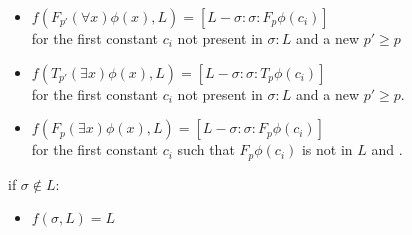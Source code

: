 {\begin{definition}
\begin{itemize}
            \item $f(F_{p'} (\forall x) \phi(x), L) = [L - \sigma: \sigma : F_{p} \phi(c_i) ]$\\ for the first constant $c_i$ not present in $\sigma:L$ and a new $p' \geq p$
            \item $f(T_{p'} (\exists x) \phi(x), L) = [L - \sigma: \sigma : T_{p} \phi(c_i) ]$ \\for the first constant $c_i$ not present in $\sigma:L$ and a new $p' \geq p$.
            \item $f(F_{p} (\exists x) \phi(x), L) = [L - \sigma: \sigma : F_{p} \phi(c_i) ]$\\ for the first constant $c_i$ such that $F_{p} \phi(c_i)$ is not in $L$ and .
        \end{itemize} 
    if $\sigma \notin L$:
    \begin{itemize}
         \item $f(\sigma,L) = L $
    \end{itemize}
\end{definition}
}


\def\wellBehavedTheorem{
    \begin{theorem}
        Given a signed sentence list L, if L is intuitionistically valid then f(L) is intuitionistically valid 
    \end{theorem}
    \begin{proof}
        \cite{book1} proves this by using the definition of forcing. We will do the most complex case, that has the most part of the ideas needed for the other ones:
        

        Case: if $L \ni F_{p} (\forall x) \phi(x) $ is intuitionistically valid, then there exists a frame $\mathcal{C}$ that respects it (in the sense of the Definition 6). 
        $\mathcal{C}$ contains q and a c $\in \mathcal{C}(q)$ such that $\mathcal{C}(c) \nVdash \phi(c)$. Let  $\mathcal{C'}$ be the same
        as $\mathcal{C}$, with the new world $\mathcal{C}(p')$ such that $\mathcal{C}(p') := \mathcal{C}(q)$ and $c_i := c$

        In other words, let  $\mathcal{C'}$ be a frame that is exactly like $\mathcal{C}$ with addition of a new structure $p' \geq p$ such that $\mathcal{C}'(p') \nVdash \phi(c_i)$ for a new $c_i$. We know that 
        $\mathcal{C}'$ exists by the definition of forcing for $\forall$ in C. Also $\mathcal{C}'$ is a frame that respects
        $f(\forall x \phi(x), L) = [L - \forall x \phi(x): \forall x \phi(x) : T_{p} \phi(c_i) ]$. 
    \end{proof}
}


